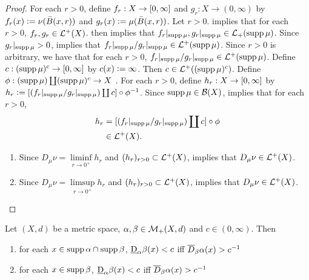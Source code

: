 \documentclass{book}
\begin{document}
	\begin{proof}
		For each $r > 0$, define $f_r: X \rightarrow [0,\infty]$ and $g_r: X \rightarrow (0, \infty)$ by $f_r(x) \vcentcolon= \nu(\bar{B}(x, r))$ and $g_r(x) \vcentcolon= \mu(\bar{B}(x, r))$. Let $r > 0$.  implies that for each $r > 0$, $f_r, g_r \in \mathcal{L}^+(X)$.  then implies that $f_r |_{\operatorname{supp} \mu}, g_r |_{\operatorname{supp} \mu} \in \mathcal{L}_+( \operatorname{supp} \mu)$. Since $g_r |_{\operatorname{supp} \mu} > 0$,  implies that $f_r|_{\operatorname{supp} \mu}/g_r|_{\operatorname{supp} \mu} \in \mathcal{L}^+(\operatorname{supp} \mu)$. Since $r >0$ is arbitrary, we have that for each $r > 0$, $f_r|_{\operatorname{supp} \mu}/g_r|_{\operatorname{supp} \mu} \in \mathcal{L}^+(\operatorname{supp} \mu)$. Define $c: (\operatorname{supp} \mu)^c \rightarrow [0,\infty]$ by $c(x) \vcentcolon= \infty$. Then $c \in \mathcal{L}^+((\operatorname{supp} \mu)^c)$. Define $\phi: (\operatorname{supp} \mu) \coprod (\operatorname{supp} \mu)^c \rightarrow X$ . For each $r > 0$, define $h_r:X \rightarrow [0,\infty]$ by $h_r \vcentcolon= [(f_r|_{\operatorname{supp} \mu}/g_r|_{\operatorname{supp} \mu}) \coprod c] \circ \phi^{-1}$. Since $\operatorname{supp} \mu \in \mathcal{B}(X)$,  implies that for each $r > 0$,
		\begin{align*}
			h_r
			& = [(f_r|_{\operatorname{supp} \mu}/g_r|_{\operatorname{supp} \mu}) \coprod c] \circ \phi \\
			& \in \mathcal{L}^+(X). 
		\end{align*} 
		\begin{enumerate}
			\item Since $D_{\mu} \nu = \liminf\limits_{r \rightarrow 0^+} h_r$ and $(h_r)_{r > 0} \subset \mathcal{L}^+(X)$,  implies that $D_{\mu} \nu \in \mathcal{L}^+(X)$.
			\item Since $D_{\mu} \nu = \limsup\limits_{r \rightarrow 0^+} h_r$ and $(h_r)_{r > 0} \subset \mathcal{L}^+(X)$,  implies that $D_{\mu} \nu \in \mathcal{L}^+(X)$.
		\end{enumerate}
	\end{proof}
	
	\begin{note}
	\end{note}

	\begin{ex} 
		Let $(X, d)$ be a metric space, $\alpha, \beta \in \mathcal{M}_+(X, d)$ and $c \in (0,\infty)$. Then 
		\begin{enumerate}
			\item for each $x \in \operatorname{supp} \alpha \cap \operatorname{supp} \beta$, $\underbar{D}_{\alpha} \beta (x) < c$ iff $\overline{D}_{\beta}\alpha(x) > c^{-1}$
			\item for each $x \in \operatorname{supp} \beta$, $\underbar{D}_{\alpha} \beta (x) < c$ iff $\overline{D}_{\beta}\alpha(x) > c^{-1}$
		\end{enumerate} 
	\end{ex}
\end{document}
